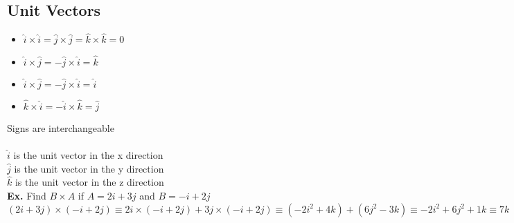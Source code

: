 \documentclass[]{article}
\begin{document}
\subsection*{Unit Vectors}
\begin{itemize}
    \item $\hat{i}\times\hat{i}=\hat{j}\times\hat{j}=\hat{k}\times\hat{k} = 0$
    \item $\hat{i}\times\hat{j}=-\hat{j}\times\hat{i}=\hat{k}$
    \item $\hat{i}\times\hat{j}=-\hat{j}\times\hat{i}=\hat{i}$
    \item $\hat{k}\times\hat{i}=-\hat{i}\times\hat{k}=\hat{j}$
\end{itemize}
Signs are interchangeable\\\\
$\hat{i}$ is the unit vector in the x direction\\
$\hat{j}$ is the unit vector in the y direction\\
$\hat{k}$ is the unit vector in the z direction\\

\textbf{Ex.} Find $B\times A$ if $A = 2i+3j$ and $B = -i+2j$\\ 
$(2i + 3j) \times (-i+2j) \equiv 2i\times(-i+2j) + 3j\times(-i+2j) \equiv (-2i^2+ 4k) + (6j^2 - 3k) \equiv -2i^2 +6j^2 + 1k \equiv 7k$\\


    
\end{document}
